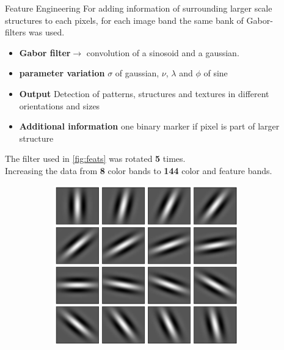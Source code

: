 \documentclass[final,20pt]{beamer}
\newlength{\sepwidth}
\newlength{\colwidth}
\newcommand{\separatorcolumn}{\begin{column}{\sepwidth}\end{column}}
\begin{document}
\begin{frame}[t]
\begin{columns}[t]
\begin{column}{\colwidth}
\end{column}

\separatorcolumn%

\begin{column}{\colwidth}
  \begin{block}{Feature Engineering}
  For adding information of surrounding larger scale structures to each pixels, for each image band the same bank of Gabor-filters was used. 
  \begin{itemize}
    \item \textbf{Gabor filter}$\rightarrow$ convolution of a sinosoid and a gaussian.
    \item \textbf{parameter variation} $\sigma$ of gaussian, $\nu$, $\lambda$ and $\phi$ of sine
    \item \textbf{Output} Detection of patterns, structures and textures in different orientations and sizes
    \item \textbf{Additional information} one binary marker if pixel is part of larger structure
  \end{itemize}
  The filter used in \cref{fig:feats} was rotated \textbf{5} times. \\ 
  Increasing the data from \textbf{8} color bands to \textbf{144} color and feature bands.
     \begin{figure}
       \begin{subfigure}{0.47\linewidth}
      \centering
      \includegraphics[width=0.9\linewidth]{figures/gabor}
    \end{subfigure}

\end{figure}
\end{block}
\end{column}
\end{columns}
\end{frame}
\end{document}
